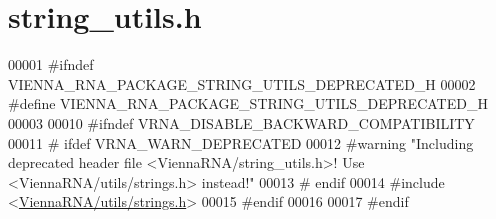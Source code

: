 \hypertarget{string__utils_8h_source}{}\section{string\+\_\+utils.\+h}
\label{string__utils_8h_source}

\begin{DoxyCode}
00001 \textcolor{preprocessor}{#ifndef VIENNA\_RNA\_PACKAGE\_STRING\_UTILS\_DEPRECATED\_H}
00002 \textcolor{preprocessor}{#define VIENNA\_RNA\_PACKAGE\_STRING\_UTILS\_DEPRECATED\_H}
00003 
00010 \textcolor{preprocessor}{#ifndef VRNA\_DISABLE\_BACKWARD\_COMPATIBILITY}
00011 \textcolor{preprocessor}{# ifdef VRNA\_WARN\_DEPRECATED}
00012 \textcolor{preprocessor}{#warning "Including deprecated header file <ViennaRNA/string\_utils.h>! Use <ViennaRNA/utils/strings.h>
       instead!"}
00013 \textcolor{preprocessor}{# endif}
00014 \textcolor{preprocessor}{#include <\hyperlink{strings_8h}{ViennaRNA/utils/strings.h}>}
00015 \textcolor{preprocessor}{#endif}
00016 
00017 \textcolor{preprocessor}{#endif}
\end{DoxyCode}
